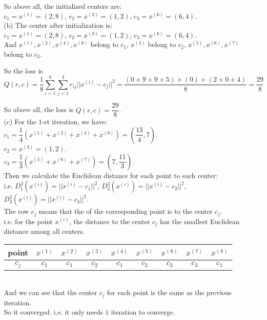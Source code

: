 \documentclass[10pt]{article}
\begin{document}
\begin{enumerate}[1.]
So above all, the initialized centers are:\\
$c_1=x^{(1)}=(2,8)$, $c_2=x^{(3)}=(1,2)$, $c_3=x^{(6)}=(6,4)$.\\
 
(b) The center after initialization is:\\
$c_1=x^{(1)}=(2,8)$, $c_2=x^{(3)}=(1,2)$, $c_3=x^{(6)}=(6,4)$.\\
And $x^{(1)},x^{(2)},x^{(4)},x^{(8)}$ belong to $c_1$, $x^{(3)}$ belong to $c_2$, $x^{(5)},x^{(6)},x^{(7)}$ belong to $c_3$.

So the loss is
$$Q(r,c)=\dfrac{1}{8}\sum\limits_{i=1}^8\sum\limits_{j=1}^3r_{ij}||x^{(i)}-c_j||^2=\dfrac{(0+9+9+5)+(0)+(2+0+4)}{8}=\dfrac{29}{8}$$

So above all, the loss is $Q(r,c)=\dfrac{29}{8}$.\\

(c) For the $1$-st iteration, we have:\\
$c_1 = \dfrac{1}{4}(x^{(1)}+x^{(2)}+x^{(4)}+x^{(8)})=(\dfrac{13}{4},7)$.\\
$c_2 = x^{(3)}=(1,2)$.\\
$c_3 = \dfrac{1}{3}(x^{(5)}+x^{(6)}+x^{(7)})=(7,\dfrac{11}{3})$.\\

Then we calculate the Euclidean distance for each point to each center:\\
i.e. $D_1^2(x^{(i)})=||x^{(i)}-c_1||^2$, $D_2^2(x^{(i)})=||x^{(i)}-c_2||^2$, $D_3^2(x^{(i)})=||x^{(i)}-c_3||^2$.\\
The row $c_j$ means that the of the corresponding point is to the center $c_j$.\\ 
i.e. for the point $x^{(i)}$, the distance to the center $c_j$ has the smallest Euclidean distance among all centers.\\ 
\begin{tabular}{|c|c|c|c|c|c|c|c|c|}
	\hline
	point & $x^{(1)}$ & $x^{(2)}$ & $x^{(3)}$ & $x^{(4)}$ & $x^{(5)}$ & $x^{(6)}$ & $x^{(7)}$ & $x^{(8)}$\\
	\hline
	\text{center} $c_j$ & $c_1$ & $c_1$ & $c_2$ & $c_1$ & $c_3$ & $c_3$ & $c_3$ & $c_1$\\
	\hline
\end{tabular}\\

And we can see that the center $c_j$ for each point is the same as the previous iteration.\\
So it converged. i.e. it only needs $1$ iteration to converge.\\


\end{enumerate}
\end{document}
